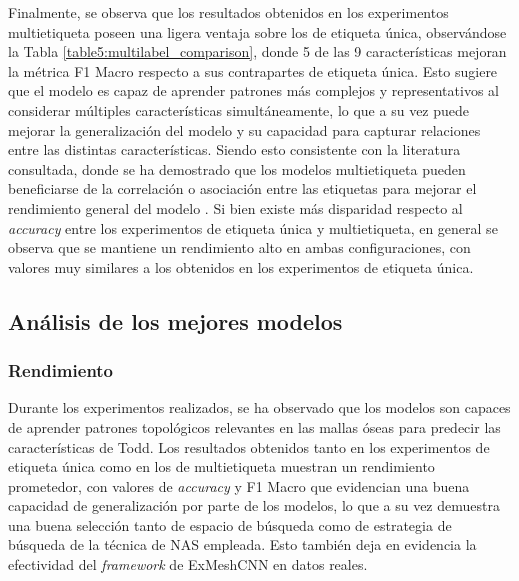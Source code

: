 Finalmente, se observa que los resultados obtenidos en los experimentos multietiqueta poseen una ligera ventaja sobre los de etiqueta única, observándose la Tabla \ref{table5:multilabel_comparison}, donde 5 de las 9 características mejoran la métrica F1 Macro respecto a sus contrapartes de etiqueta única. Esto sugiere que el modelo es capaz de aprender patrones más complejos y representativos al considerar múltiples características simultáneamente, lo que a su vez puede mejorar la generalización del modelo y su capacidad para capturar relaciones entre las distintas características. Siendo esto consistente con la literatura consultada, donde se ha demostrado que los modelos multietiqueta pueden beneficiarse de la correlación o asociación entre las etiquetas para mejorar el rendimiento general del modelo \cite{ranjan_hyperface_2019}. Si bien existe más disparidad respecto al \textit{accuracy} entre los experimentos de etiqueta única y multietiqueta, en general se observa que se mantiene un rendimiento alto en ambas configuraciones, con valores muy similares a los obtenidos en los experimentos de etiqueta única.

\subsection{Análisis de los mejores modelos}
\subsubsection{Rendimiento}
\label{best_models_analysis}
Durante los experimentos realizados, se ha observado que los modelos son capaces de aprender patrones topológicos relevantes en las mallas óseas para predecir las características de Todd. Los resultados obtenidos tanto en los experimentos de etiqueta única como en los de multietiqueta muestran un rendimiento prometedor, con valores de \textit{accuracy} y F1 Macro que evidencian una buena capacidad de generalización por parte de los modelos, lo que a su vez demuestra una buena selección tanto de espacio de búsqueda como de estrategia de búsqueda de la técnica de NAS empleada. Esto también deja en evidencia la efectividad del \textit{framework} de ExMeshCNN en datos reales.

